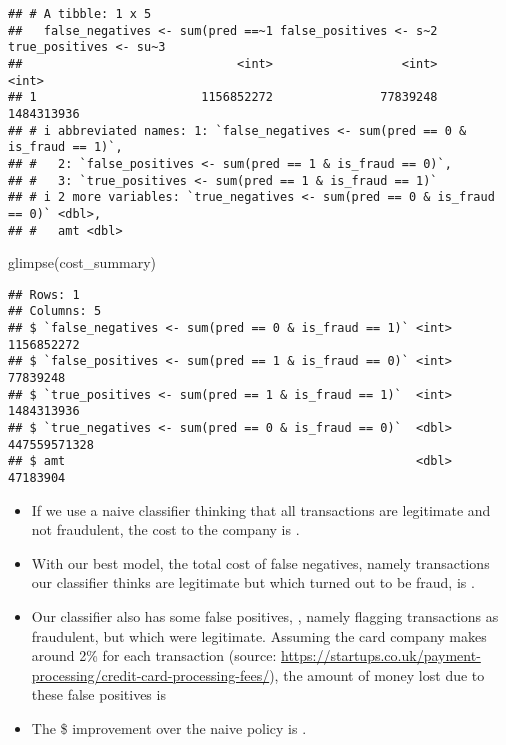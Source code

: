 \documentclass[
]{article}
\newenvironment{Shaded}{\begin{snugshade}}{\end{snugshade}}
\newcommand{\FunctionTok}[1]{\textcolor[rgb]{0.00,0.00,0.00}{#1}}
\newcommand{\NormalTok}[1]{#1}
\begin{document}
\begin{verbatim}
## # A tibble: 1 x 5
##   false_negatives <- sum(pred ==~1 false_positives <- s~2 true_positives <- su~3
##                              <int>                  <int>                  <int>
## 1                       1156852272               77839248             1484313936
## # i abbreviated names: 1: `false_negatives <- sum(pred == 0 & is_fraud == 1)`,
## #   2: `false_positives <- sum(pred == 1 & is_fraud == 0)`,
## #   3: `true_positives <- sum(pred == 1 & is_fraud == 1)`
## # i 2 more variables: `true_negatives <- sum(pred == 0 & is_fraud == 0)` <dbl>,
## #   amt <dbl>
\end{verbatim}

\begin{Shaded}
\begin{Highlighting}[]
\FunctionTok{glimpse}\NormalTok{(cost\_summary)}
\end{Highlighting}
\end{Shaded}

\begin{verbatim}
## Rows: 1
## Columns: 5
## $ `false_negatives <- sum(pred == 0 & is_fraud == 1)` <int> 1156852272
## $ `false_positives <- sum(pred == 1 & is_fraud == 0)` <int> 77839248
## $ `true_positives <- sum(pred == 1 & is_fraud == 1)`  <int> 1484313936
## $ `true_negatives <- sum(pred == 0 & is_fraud == 0)`  <dbl> 447559571328
## $ amt                                                 <dbl> 47183904
\end{verbatim}

\begin{itemize}
\item
  If we use a naive classifier thinking that all transactions are
  legitimate and not fraudulent, the cost to the company is .
\item
  With our best model, the total cost of false negatives, namely
  transactions our classifier thinks are legitimate but which turned out
  to be fraud, is .
\item
  Our classifier also has some false positives, , namely flagging
  transactions as fraudulent, but which were legitimate. Assuming the
  card company makes around 2\% for each transaction (source:
  \url{https://startups.co.uk/payment-processing/credit-card-processing-fees/}),
  the amount of money lost due to these false positives is
\item
  The \$ improvement over the naive policy is .
\end{itemize}
\end{document}
